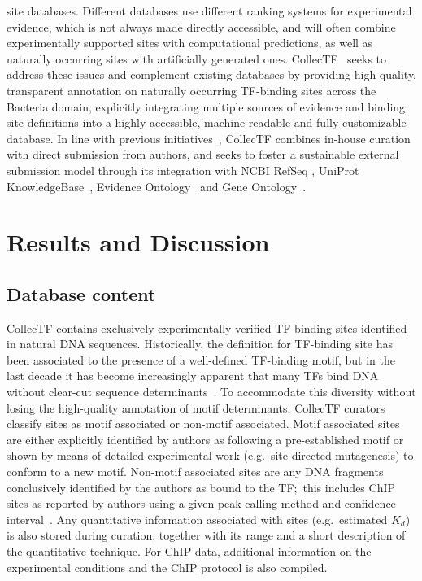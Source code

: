 site databases. Different databases use different ranking systems for
experimental evidence, which is not always made directly accessible, and will
often combine experimentally supported sites with computational predictions, as
well as naturally occurring sites with artificially generated
ones. CollecTF~\citep{kilic2013collectf} seeks to address these issues and
complement existing databases by providing high-quality, transparent annotation
on naturally occurring TF-binding sites across the Bacteria domain, explicitly
integrating multiple sources of evidence and binding site definitions into a
highly accessible, machine readable and fully customizable database. In line
with previous initiatives~\citep{griffith2008oreganno}, CollecTF combines
in-house curation with direct submission from authors, and seeks to foster a
sustainable external submission model through its integration with NCBI RefSeq
\citep{pruitt2007ncbi}, UniProt KnowledgeBase~\citep{uniprot2014uniprot},
Evidence Ontology~\citep{chibucos2014standardized} and Gene
Ontology~\citep{gene2004gene}.

\section{Results and Discussion}

\subsection{Database content}

CollecTF contains exclusively experimentally verified TF-binding sites
identified in natural DNA sequences. Historically, the definition for
TF-binding site has been associated to the presence of a well-defined
TF-binding motif, but in the last decade it has become increasingly apparent
that many TFs bind DNA without clear-cut sequence
determinants~\citep{hijum2009mechanisms, paul2007integration,
  barnard2004regulation}. To accommodate this diversity without losing the
high-quality annotation of motif determinants, CollecTF curators classify sites
as motif associated or non-motif associated. Motif associated sites are either
explicitly identified by authors as following a pre-established motif or shown
by means of detailed experimental work (e.g.\ site-directed mutagenesis) to
conform to a new motif. Non-motif associated sites are any DNA fragments
conclusively identified by the authors as bound to the TF;\ this includes ChIP
sites as reported by authors using a given peak-calling method and confidence
interval~\citep{pepke2009computation}.
 Any quantitative information associated with sites (e.g.\ estimated
$K_d$) is also stored during curation, together with its range and a short
description of the quantitative technique. For ChIP data, additional
information on the experimental conditions and the ChIP protocol is also
compiled.

